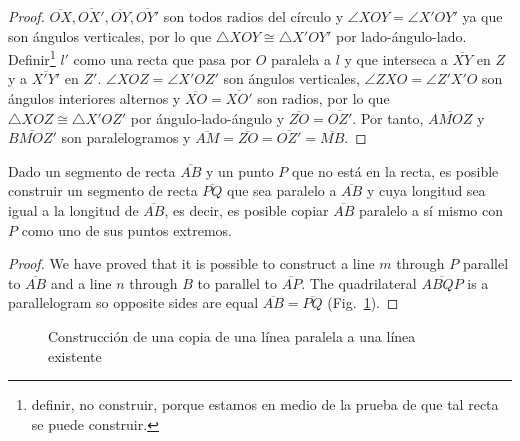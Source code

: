 \begin{proof}
$\overline{OX}, \overline{OX'}, \overline{OY}, \overline{OY'}$ son todos radios del círculo y $\angle XOY = \angle X'OY'$ ya que son ángulos verticales, por lo que $\triangle XOY\cong\triangle X'OY'$ por lado-ángulo-lado. Definir\footnote{definir, no construir, porque estamos en medio de la prueba de que tal recta se puede construir.} $l'$ como una recta que pasa por $O$ paralela a $l$ y que interseca a $\overline{XY}$ en $Z$ y a $\overline{X'Y'}$ en $Z'$. $\angle XOZ=\angle X'OZ'$ son ángulos verticales, $\angle ZXO=\angle Z'X'O$ son ángulos interiores alternos y $\overline{XO}=\overline{XO'}$ son radios, por lo que $\triangle XOZ\cong\triangle X'OZ'$ por ángulo-lado-ángulo y $\overline{ZO}=\overline{OZ'}$. Por tanto, $\overline{AMOZ}$ y $\overline{BMOZ'}$ son paralelogramos y $\overline{AM}=\overline{ZO}=\overline{OZ'}=\overline{MB}$.
\end{proof}

\begin{theorem}\label{thm.parallel-equal}
Dado un segmento de recta $\overline{AB}$ y un punto $P$ que no está en la recta, es posible construir un segmento de recta $\overline{PQ}$ que sea paralelo a $\overline{AB}$ y cuya longitud sea igual a la longitud de $\overline{AB}$, es decir, es posible copiar $\overline{AB}$ paralelo a sí mismo con $P$ como uno de sus puntos extremos.
\end{theorem}

\begin{proof}
We have proved that it is possible to construct a line $m$ through $P$ parallel to $\overline{AB}$ and a line $n$ through $B$ to parallel to $\overline{AP}$. The quadrilateral $\overline{ABQP}$ is a parallelogram so opposite sides are equal $\overline{AB}=\overline{PQ}$ (Fig.~\ref{f.se-parallel-other4}).
\end{proof}

\begin{figure}[t]
\begin{center}
\end{center}
\caption{Construcción de una copia de una línea paralela a una línea existente}\label{f.se-parallel-other4}
\end{figure}

